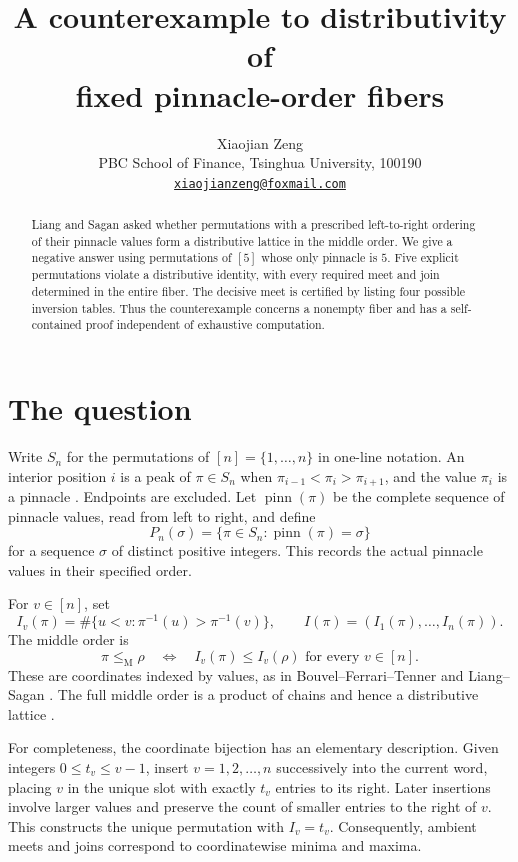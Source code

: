\documentclass[11pt]{article}
\title{A counterexample to distributivity of\protect\\ fixed pinnacle-order fibers}
\author{Xiaojian Zeng\\[3pt]
  \small PBC School of Finance, Tsinghua University, 100190\\
  \small \href{mailto:xiaojianzeng@foxmail.com}{\texttt{xiaojianzeng@foxmail.com}}}
\date{}
\newcommand{\pinn}{\operatorname{pinn}}
\newcommand{\leM}{\leq_{\mathrm M}}
\begin{document}
\maketitle

\begin{abstract}
Liang and Sagan asked whether permutations with a prescribed left-to-right
ordering of their pinnacle values form a distributive lattice in the
middle order. We give a negative answer using permutations of $[5]$ whose
only pinnacle is $5$. Five explicit permutations violate a distributive
identity, with every required meet and join determined in the entire
fiber. The decisive meet is certified by listing four possible inversion
tables. Thus the counterexample concerns a nonempty fiber and has a
self-contained proof independent of exhaustive computation.
\end{abstract}

\section{The question}

Write $S_n$ for the permutations of $[n]=\{1,\ldots,n\}$ in one-line
notation. An interior position $i$ is a peak of $\pi\in S_n$ when
$\pi_{i-1}<\pi_i>\pi_{i+1}$, and the value $\pi_i$ is a pinnacle
\cite{DNPT}. Endpoints are excluded. Let $\pinn(\pi)$ be the complete
sequence of pinnacle values, read from left to right, and define
\[
  P_n(\sigma)=\{\pi\in S_n:\pinn(\pi)=\sigma\}
\]
for a sequence $\sigma$ of distinct positive integers. This records the
actual pinnacle values in their specified order.

For $v\in[n]$, set
\[
 I_v(\pi)=\#\{u<v:\pi^{-1}(u)>\pi^{-1}(v)\},
 \qquad I(\pi)=(I_1(\pi),\ldots,I_n(\pi)).
\]
The middle order is
\[
 \pi\leM\rho\quad\Longleftrightarrow\quad
 I_v(\pi)\le I_v(\rho)\text{ for every }v\in[n].
\]
These are coordinates indexed by values, as in
Bouvel--Ferrari--Tenner \cite{BFT} and Liang--Sagan \cite[Section~6]{LS}.
The full middle order is a product of chains and hence a distributive
lattice \cite[Section~1]{BFT}.

For completeness, the coordinate bijection has an elementary description.
Given integers $0\le t_v\le v-1$, insert $v=1,2,\ldots,n$ successively
into the current word, placing $v$ in the unique slot with exactly $t_v$
entries to its right. Later insertions involve larger values and preserve
the count of smaller entries to the right of $v$. This constructs the
unique permutation with $I_v=t_v$. Consequently, ambient meets and joins
correspond to coordinatewise minima and maxima.
\end{document}
